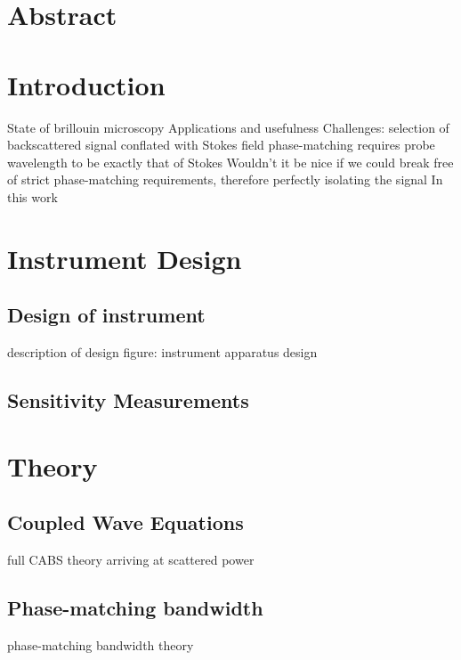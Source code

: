 
\section{Abstract}
\label{sec:CABS:Abstract}
\lipsum[1]

\section{Introduction}
\label{sec:CABS:Introduction}
\lipsum[1]
State of brillouin microscopy
Applications and usefulness
Challenges: selection of backscattered signal
  conflated with Stokes field
  phase-matching requires probe wavelength to be exactly that of Stokes
Wouldn't it be nice if we could break free of strict phase-matching requirements, therefore perfectly isolating the signal
In this work

\section{Instrument Design} %
\label{sec:CABS:Design}
\lipsum[1]

  \subsection{Design of instrument}
  \label{subsec:CABS:Design:Design}
  \lipsum[1]
  description of design
  figure: instrument
    apparatus design

  \subsection{Sensitivity Measurements}
  \label{subsec:CABS:Design:Sensitivity}
  \lipsum[1]

\section{Theory}
\label{sec:CABS:Theory}
\lipsum[1]

  \subsection{Coupled Wave Equations}
  \label{subsec:CABS:Theory:Coupled-Wave}
  \lipsum[1]
  full CABS theory arriving at scattered power

  \subsection{Phase-matching bandwidth}
  \label{subsec:CABS:Theory:Phase-Matching}
  \lipsum[1]
  phase-matching bandwidth theory

